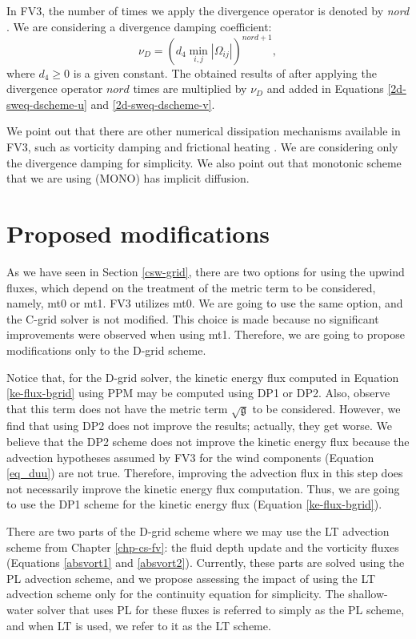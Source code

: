 In FV3, the number of times we apply the divergence operator is denoted by \textit{nord} \citep{harris:2021}.
We are considering a divergence damping coefficient:
\begin{equation}
	\nu_D = (d_4 \min_{i,j} |\Omega_{ij}|)^{nord+1},
\end{equation}
where $d_4 \ge 0$  is a given constant.
The obtained results of after applying the divergence operator $nord$ times
are multiplied by $\nu_D$ and added in Equations \eqref{2d-sweq-dscheme-u} and \eqref{2d-sweq-dscheme-v}.

We point out that there are other numerical dissipation mechanisms available in FV3, such as vorticity damping and frictional heating \citep{harris:2021}. 
We are considering only the divergence damping for simplicity.
We also point out that monotonic scheme that we are using (MONO) has implicit diffusion.

\section{Proposed modifications}
\label{sw-modf}
As we have seen in Section \ref{csw-grid}, there are two options for using the upwind fluxes, 
which depend on the treatment of the metric term to be considered, namely, mt0 or mt1.
FV3 utilizes mt0. We are going to use the same option, and the C-grid solver is not modified.
This choice is made because no significant improvements were observed when using mt1.
Therefore, we are going to propose modifications only to the D-grid scheme.

Notice that, for the D-grid solver, the kinetic energy flux computed in Equation \eqref{ke-flux-bgrid} using PPM may be computed using DP1 or DP2. 
Also, observe that this term does not have the metric term $\sqrt{\mathfrak{g}}$ to be considered.
However, we find that using DP2 does not improve the results; actually, they get worse.
We believe that the DP2 scheme does not improve the kinetic energy flux because the advection hypotheses 
assumed by FV3 for the wind components (Equation \eqref{eq_duu}) are not true.
Therefore, improving the advection flux in this step does not necessarily improve the kinetic energy flux computation.
Thus, we are going to use the DP1 scheme for the kinetic energy flux (Equation \eqref{ke-flux-bgrid}).

There are two parts of the D-grid scheme where we may use the LT advection scheme from Chapter \ref{chp-cs-fv}:
the fluid depth update and the vorticity fluxes (Equations \eqref{absvort1} and \eqref{absvort2}).
Currently, these parts are solved using the PL advection scheme, and we propose assessing the impact of using the LT advection scheme
only for the continuity equation for simplicity.
The shallow-water solver that uses PL for these fluxes is referred to simply as the PL scheme, and when LT is used, we refer to it as the LT scheme.

